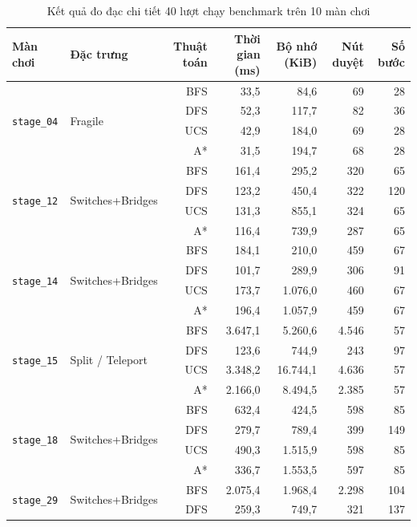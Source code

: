 \begin{table}[H]
\centering
\caption{Kết quả đo đạc chi tiết 40 lượt chạy benchmark trên 10 màn chơi}
\label{tab:benchmark_detailed}
\scriptsize
\begin{tabular}{llrrrrr}
\toprule
\textbf{Màn chơi} & \textbf{Đặc trưng} & \textbf{Thuật toán}
& \textbf{Thời gian (ms)} & \textbf{Bộ nhớ (KiB)}
& \textbf{Nút duyệt} & \textbf{Số bước} \\
\midrule
\multirow{4}{*}{\texttt{stage\_04}} & \multirow{4}{*}{Fragile}
  & BFS & 33,5 & 84,6 & 69 & 28 \\
& & DFS & 52,3 & 117,7 & 82 & 36 \\
& & UCS & 42,9 & 184,0 & 69 & 28 \\
& & A*  & 31,5 & 194,7 & 68 & 28 \\
\midrule
\multirow{4}{*}{\texttt{stage\_12}} & \multirow{4}{*}{Switches+Bridges}
  & BFS & 161,4 & 295,2 & 320 & 65 \\
& & DFS & 123,2 & 450,4 & 322 & 120 \\
& & UCS & 131,3 & 855,1 & 324 & 65 \\
& & A*  & 116,4 & 739,9 & 287 & 65 \\
\midrule
\multirow{4}{*}{\texttt{stage\_14}} & \multirow{4}{*}{Switches+Bridges}
  & BFS & 184,1 & 210,0 & 459 & 67 \\
& & DFS & 101,7 & 289,9 & 306 & 91 \\
& & UCS & 173,7 & 1.076,0 & 460 & 67 \\
& & A*  & 196,4 & 1.057,9 & 459 & 67 \\
\midrule
\multirow{4}{*}{\texttt{stage\_15}} & \multirow{4}{*}{Split / Teleport}
  & BFS & 3.647,1 & 5.260,6 & 4.546 & 57 \\
& & DFS & 123,6 & 744,9 & 243 & 97 \\
& & UCS & 3.348,2 & 16.744,1 & 4.636 & 57 \\
& & A*  & 2.166,0 & 8.494,5 & 2.385 & 57 \\
\midrule
\multirow{4}{*}{\texttt{stage\_18}} & \multirow{4}{*}{Switches+Bridges}
  & BFS & 632,4 & 424,5 & 598 & 85 \\
& & DFS & 279,7 & 789,4 & 399 & 149 \\
& & UCS & 490,3 & 1.515,9 & 598 & 85 \\
& & A*  & 336,7 & 1.553,5 & 597 & 85 \\
\midrule
\multirow{4}{*}{\texttt{stage\_29}} & \multirow{4}{*}{Switches+Bridges}
  & BFS & 2.075,4 & 1.968,4 & 2.298 & 104 \\
& & DFS & 259,3 & 749,7 & 321 & 137 \\

\end{tabular}
\end{table}
